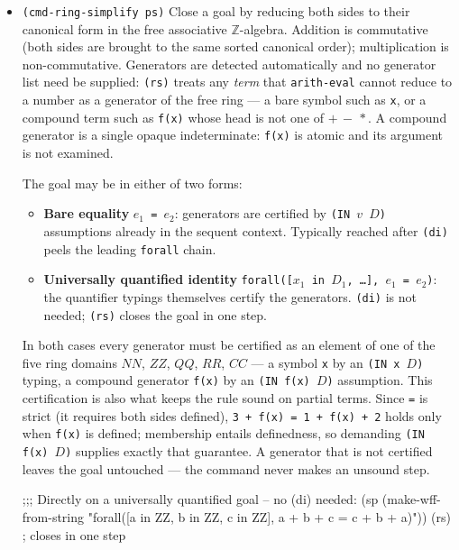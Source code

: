 \begin{itemize}
\item \texttt{(cmd-ring-simplify ps)}
  Close a goal by reducing both sides to their canonical form in the free
  associative $\mathbb{Z}$-algebra.  Addition is commutative (both sides
  are brought to the same sorted canonical order); multiplication is
  non-commutative.  Generators are detected automatically and no generator
  list need be supplied: \texttt{(rs)} treats any \emph{term} that
  \texttt{arith-eval} cannot reduce to a number as a generator of the free
  ring --- a bare symbol such as \texttt{x}, or a compound term such as
  \texttt{f(x)} whose head is not one of $+\,-\,*$.  A compound generator is
  a single opaque indeterminate: \texttt{f(x)} is atomic and its argument is
  not examined.

  The goal may be in either of two forms:
  \begin{itemize}
  \item \textbf{Bare equality} \texttt{$e_1$ = $e_2$}: generators are
    certified by \texttt{(IN $v$ $D$)} assumptions already in the sequent
    context.  Typically reached after \texttt{(di)} peels the leading
    \texttt{forall} chain.
  \item \textbf{Universally quantified identity}
    \texttt{forall([$x_1$ in $D_1$, \ldots], $e_1$ = $e_2$)}: the
    quantifier typings themselves certify the generators.  \texttt{(di)}
    is not needed; \texttt{(rs)} closes the goal in one step.
  \end{itemize}

  In both cases every generator must be certified as an element of one of
  the five ring domains $\mathit{NN}$, $\mathit{ZZ}$, $\mathit{QQ}$,
  $\mathit{RR}$, $\mathit{CC}$ --- a symbol \texttt{x} by an
  \texttt{(IN x $D$)} typing, a compound generator \texttt{f(x)} by an
  \texttt{(IN f(x) $D$)} assumption.  This certification is also what keeps
  the rule sound on partial terms.  Since \texttt{=} is strict (it requires
  both sides defined), \texttt{3 + f(x) = 1 + f(x) + 2}
  holds only when \texttt{f(x)} is defined; membership entails definedness,
  so demanding \texttt{(IN f(x) $D$)} supplies exactly that guarantee.  A
  generator that is not certified leaves the goal untouched --- the command
  never makes an unsound step.

  \begin{VNBcode}
;;; Directly on a universally quantified goal -- no (di) needed:
(sp (make-wff-from-string
  "forall([a in ZZ, b in ZZ, c in ZZ], a + b + c = c + b + a)"))
(rs)    ; closes in one step


\end{VNBcode}
\end{itemize}
